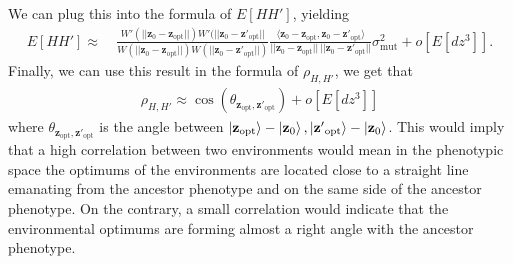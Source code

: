 \documentclass[11pt]{article}
\begin{document}
    We can plug this into the formula of $E[HH']$, yielding
    \begin{align*}
        E[HH'] \approx&\ 
        \frac{W'(||\mathbf{z}_0 - \mathbf{z}_{\mathrm{opt}} ||) W'(||\mathbf{z}_0 - \mathbf{z'}_{\mathrm{opt}} ||}{W(||\mathbf{z}_0 - \mathbf{z}_{\mathrm{opt}} ||)W(||\mathbf{z}_0 - \mathbf{z'}_{\mathrm{opt}} ||)}\frac{\langle\mathbf{z}_0 - \mathbf{z}_{\mathrm{opt}},\mathbf{z}_0 - \mathbf{z'}_{\mathrm{opt}} \rangle}{||\mathbf{z}_0 - \mathbf{z}_{\mathrm{opt}} || \ ||\mathbf{z}_0 - \mathbf{z'}_{\mathrm{opt}} ||} \sigma_{\mathrm{mut}}^2 + o[E[dz^3]].
    \end{align*}
    Finally, we can use this result in the formula of $\rho_{H,H'}$, we get that
    \begin{align*}
        \rho_{H,H'} \approx
        \cos(\theta_{\mathbf{z_{\mathrm{opt}},z'_{\mathrm{opt}}}}) + o[E[dz^3]] \tag{9}
    \end{align*}
    where $\theta_{\mathbf{z_{\mathrm{opt}},z'_{\mathrm{opt}}}}$ is the angle between $\ket{\mathbf{z}_{\mathrm{opt}}}-\ket{\mathbf{z}_0}, \ket{\mathbf{z'}_{\mathrm{opt}}}-\ket{\mathbf{z}_0}$. This would imply that a high correlation between two environments would mean in the phenotypic space the optimums of the environments are located close to a straight line emanating from the ancestor phenotype and on the same side of the ancestor phenotype. On the contrary, a small correlation would indicate that the environmental optimums are forming almost a right angle with the ancestor phenotype. 
        
\end{document}
